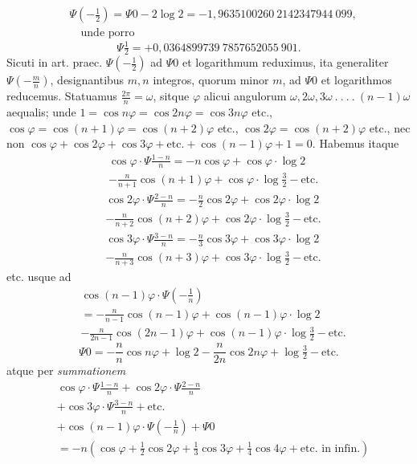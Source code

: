 \[
\begin{aligned}
&\Psi\left(-\tfrac12\right)=\Psi0-2\log2=-1{,}9635100260\ 2142347944\ 099,\\[4pt]
&\quad\text{unde porro}
\end{aligned}
\]
\[
\Psi\tfrac12=+0{,}0364899739\ 7857652055\ 901.
\]
Sicuti in art. praec. $\Psi\left(-\tfrac12\right)$ ad $\Psi0$ et logarithmum reduximus, ita generaliter $\Psi\left(-\frac mn\right)$, designantibus $m,n$ integros, quorum minor $m$, ad $\Psi0$ et logarithmos reducemus. Statuamus $\frac{2\pi}{n}=\omega$, sitque $\varphi$ alicui angulorum $\omega,2\omega,3\omega\ .\ .\ .\ .\ (n-1)\omega$ aequalis; unde $1=\cos n\varphi=\cos2n\varphi=\cos3n\varphi$ etc., $\cos\varphi=\cos(n+1)\varphi=\cos(n+2)\varphi$ etc., $\cos2\varphi=\cos(n+2)\varphi$ etc., nec non $\cos\varphi+\cos2\varphi+\cos3\varphi+\text{etc.}+\cos(n-1)\varphi+1=0$. Habemus itaque
\[
\begin{aligned}
&\cos\varphi\cdot\Psi\frac{1-n}{n}=-n\cos\varphi+\cos\varphi\cdot\log2\\[4pt]
&-\frac{n}{n+1}\cos(n+1)\varphi+\cos\varphi\cdot\log\tfrac32-\text{etc.}
\end{aligned}
\]
\[
\begin{aligned}
&\cos2\varphi\cdot\Psi\frac{2-n}{n}=-\frac n2\cos2\varphi+\cos2\varphi\cdot\log2\\[4pt]
&-\frac{n}{n+2}\cos(n+2)\varphi+\cos2\varphi\cdot\log\tfrac32-\text{etc.}
\end{aligned}
\]
\[
\begin{aligned}
&\cos3\varphi\cdot\Psi\frac{3-n}{n}=-\frac n3\cos3\varphi+\cos3\varphi\cdot\log2\\[4pt]
&-\frac{n}{n+3}\cos(n+3)\varphi+\cos3\varphi\cdot\log\tfrac32-\text{etc.}
\end{aligned}
\]
etc. usque ad
\[
\begin{aligned}
&\cos(n-1)\varphi\cdot\Psi\left(-\frac1n\right)
\\[4pt]
&=-\frac{n}{n-1}\cos(n-1)\varphi+\cos(n-1)\varphi\cdot\log2\\[4pt]
&-\frac{n}{2n-1}\cos(2n-1)\varphi
+\cos(n-1)\varphi\cdot\log\tfrac32-\text{etc.}
\end{aligned}
\]
\[
\Psi0=-\frac nn\cos n\varphi+\log2-\frac{n}{2n}\cos2n\varphi+\log\tfrac32-\text{etc.}
\]
atque per \textit{summationem}
\[
\begin{aligned}
&\cos\varphi\cdot\Psi\frac{1-n}{n}+\cos2\varphi\cdot\Psi\frac{2-n}{n}\\[4pt]
&+\cos3\varphi\cdot\Psi\frac{3-n}{n}+\text{etc.}\\[4pt]
&+\cos(n-1)\varphi\cdot\Psi\left(-\frac1n\right)+\Psi0
\\[4pt]
&=-n(\cos\varphi+\tfrac12\cos2\varphi+\tfrac13\cos3\varphi+\tfrac14\cos4\varphi+\text{etc. in infin.})
\end{aligned}
\]
